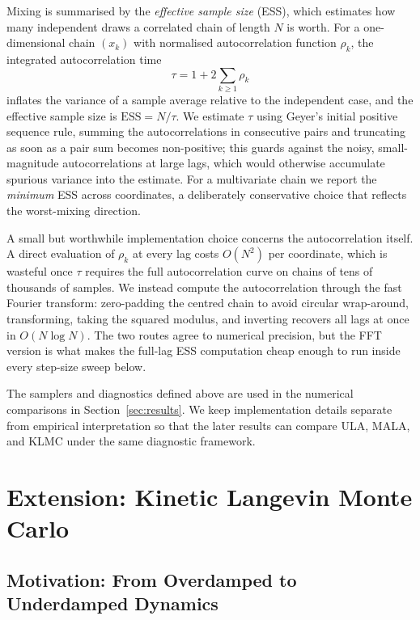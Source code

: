 \documentclass[a4paper,11pt, titlepage]{article}
\theoremstyle{definition}
\theoremstyle{plain}
\theoremstyle{remark}
\begin{document}
Mixing is summarised by the \emph{effective sample size} (ESS), which
estimates how many independent draws a correlated chain of length $N$ is
worth. For a one-dimensional chain $(x_k)$ with normalised
autocorrelation function $\rho_k$, the integrated autocorrelation time
\[
\tau = 1 + 2\sum_{k\geq 1}\rho_k
\]
inflates the variance of a sample average relative to the independent
case, and the effective sample size is $\mathrm{ESS} = N/\tau$. We
estimate $\tau$ using Geyer's initial positive sequence rule, summing
the autocorrelations in consecutive pairs and truncating as soon as a
pair sum becomes non-positive; this guards against the noisy,
small-magnitude autocorrelations at large lags, which would otherwise
accumulate spurious variance into the estimate. For a multivariate chain
we report the \emph{minimum} ESS across coordinates, a deliberately
conservative choice that reflects the worst-mixing direction.

A small but worthwhile implementation choice concerns the
autocorrelation itself. A direct evaluation of $\rho_k$ at every lag
costs $O(N^2)$ per coordinate, which is wasteful once $\tau$ requires
the full autocorrelation curve on chains of tens of thousands of
samples. We instead compute the autocorrelation through the fast Fourier
transform: zero-padding the centred chain to avoid circular wrap-around,
transforming, taking the squared modulus, and inverting recovers all
lags at once in $O(N\log N)$. The two routes agree to numerical
precision, but the FFT version is what makes the full-lag ESS
computation cheap enough to run inside every step-size sweep below.

The samplers and diagnostics defined above are used in the numerical comparisons in Section~\ref{sec:results}. We keep implementation details separate from empirical interpretation so that the later results can compare ULA, MALA, and KLMC under the same diagnostic framework.

\section{Extension: Kinetic Langevin Monte Carlo}
\label{sec:extension}

\subsection{Motivation: From Overdamped to Underdamped Dynamics}
\label{sec:ext-motivation}
\end{document}
